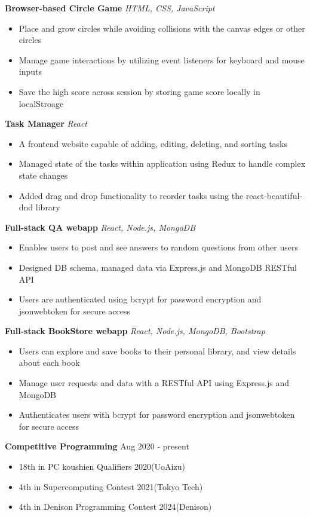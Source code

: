\documentclass[a4paper,12pt]{article}
\begin{document}
\textbf{Browser-based Circle Game}
\href{https://uliba3.github.io/CircleGame/}{\faGlobe}
\href{https://github.com/uliba3/CircleGame}{\faGithub}
\textit{HTML, CSS, JavaScript}
\begin{itemize}
    \item Place and grow circles while avoiding collisions with the canvas edges or other circles
    \item Manage game interactions by utilizing event listeners for keyboard and mouse inputs
    \item Save the high score across session by storing game score locally in localStroage
\end{itemize}
\textbf{Task Manager}
\href{https://uliba3.github.io/TaskManager/}{\faGlobe}
\href{https://github.com/uliba3/TaskManager}{\faGithub}
\textit{React}
\begin{itemize}
    \item A frontend website capable of adding, editing, deleting, and sorting tasks
    \item Managed state of the tasks within application using Redux to handle complex state changes
    \item Added drag and drop functionality to reorder tasks using the react-beautiful-dnd library
\end{itemize}
\textbf{Full-stack QA webapp}
\href{https://white-voice-4708.fly.dev/}{\faGlobe}
\href{https://github.com/uliba3/Q-A-backend}{\faGithub}
\textit{React, Node.js, MongoDB}
\begin{itemize}
    \item Enables users to post and see answers to random questions from other users
    \item Designed DB schema, managed data via Express.js and MongoDB RESTful API
    \item Users are authenticated using bcrypt for password encryption and jsonwebtoken for secure access
\end{itemize}
\textbf{Full-stack BookStore webapp}
\href{https://bookstore-backend.fly.dev/}{\faGlobe}
\href{https://github.com/uliba3/BookStore-backend}{\faGithub}
\textit{React, Node.js, MongoDB, Bootstrap}
\begin{itemize}
    \item Users can explore and save books to their personal library, and view details about each book
    \item Manage user requests and data with a RESTful API using Express.js and MongoDB
    \item Authenticates users with bcrypt for password encryption and jsonwebtoken for secure access
\end{itemize}

\textbf{Competitive Programming} \hfill \textnormal{Aug 2020 - present}
\begin{itemize}
    \item 18th in PC koushien Qualifiers 2020(UoAizu)
    \item 4th in Supercomputing Contest 2021(Tokyo Tech)
    \item 4th in Denison Programming Contest 2024(Denison)
\end{itemize}
\end{document}
